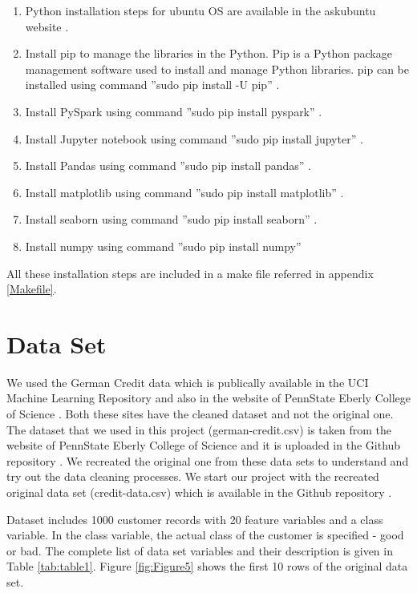 \documentclass[sigconf]{acmart}
\begin{document}
\begin{enumerate}
  \item Python installation steps for ubuntu OS are available in the askubuntu website \cite{python-installations}.
  \item Install pip to manage the libraries in the Python. Pip is a Python package management software used to install and manage Python libraries. pip can be installed using command ''sudo pip install -U pip'' \cite{pip-package}.   
  \item Install PySpark using command ''sudo pip install pyspark'' \cite{pyspark-installation}.
  \item Install Jupyter notebook using command ''sudo pip install jupyter'' \cite{jupyter-installation}.
   \item Install Pandas using command ''sudo pip install pandas'' \cite{pandas-installation}.
   \item Install matplotlib using command ''sudo pip install matplotlib'' \cite{matplotlib-installation}.
   \item Install seaborn using command ''sudo pip install seaborn'' \cite{seaborn-installation}.
   \item Install numpy using command ''sudo pip install numpy'' \cite{numpy-installation}
\end{enumerate}

All these installation steps are included in a make file referred in appendix \ref{Makefile}.

\section{Data Set}

We used the German Credit data which is publically available in the UCI Machine Learning Repository \cite{uci} and also in the website of PennState Eberly College of Science \cite{psu-site}. Both these sites have the cleaned dataset and not the original one. The dataset that we used in this project (german-credit.csv) is taken from the website of PennState Eberly College of Science \cite{psu-site} and it is uploaded in the Github repository \cite{github}. We recreated the original one from these data sets to understand and try out the data cleaning processes. We start our project with the recreated original data set (credit-data.csv) which is available in the Github repository \cite{github}. 

Dataset includes 1000 customer records with 20 feature variables and a class variable. In the class variable, the actual class of the customer is specified - good or bad. The complete list of data set variables and their description is given in Table \ref{tab:table1}. Figure \ref{fig:Figure5} shows the first 10 rows of the original data set.
\end{document}
